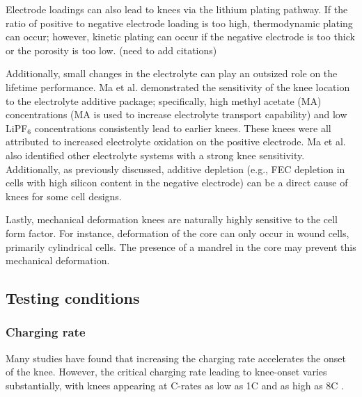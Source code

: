 \documentclass[journal=jpclcd,manuscript=article]{achemso}
\begin{document}
Electrode loadings can also lead to knees via the lithium plating pathway.
If the ratio of positive to negative electrode loading is too high, thermodynamic plating can occur; however, kinetic plating can occur if the negative electrode is too thick or the porosity is too low. (need to add citations)

Additionally, small changes in the electrolyte can play an outsized role on the lifetime performance. Ma et al.\cite{ma_editors_2019} demonstrated the sensitivity of the knee location to the electrolyte additive package; specifically, high methyl acetate (MA) concentrations (MA is used to increase electrolyte transport capability) and low LiPF$_6$ concentrations consistently lead to earlier knees. These knees were all attributed to increased electrolyte oxidation on the positive electrode. Ma et al.\cite{ma_editors_2019} also identified other electrolyte systems with a strong knee sensitivity. Additionally, as previously discussed, additive depletion (e.g., FEC depletion in cells with high silicon content in the negative electrode) can be a direct cause of knees for some cell designs.\cite{petibon_studies_2016, jung_consumption_2016}

Lastly, mechanical deformation knees are naturally highly sensitive to the cell form factor. For instance, deformation of the core \cite{pfrang_long-term_2018,carter_mechanical_2019,willenberg_development_2020} can only occur in wound cells, primarily cylindrical cells. The presence of a mandrel in the core may prevent this mechanical deformation.\cite{carter_mechanical_2019}

\subsection{Testing conditions}

\subsubsection{Charging rate}
Many studies have found that increasing the charging rate accelerates the onset of the knee.\cite{lewerenz_systematic_2017,lewerenz_post-mortem_2017, petzl_lithium_2015, burns_-situ_2015, waldmann_optimization_2015, schuster_nonlinear_2015, severson_data-driven_2019, schindler_fast_2018, keil_linear_2019} However, the critical charging rate leading to knee-onset varies substantially, with knees appearing at C-rates as low as 1C \cite{waldmann_optimization_2015} and as high as 8C \cite{lewerenz_systematic_2017}. 
\end{document}
